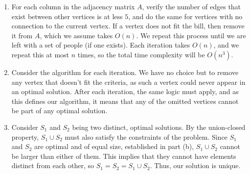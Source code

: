\documentclass{article}
\begin{document}
\begin{solution}
\begin{enumerate}[label=(\alph*)]
	\item For each column in the adjacency matrix $A$, verify the number of edges that exist between other vertices is at less $5$, and do the same for vertices with no connection to the current vertex. If a vertex does not fit the bill, then remove it from $A$, which we assume takes $O(n)$.  We repeat this process until we are left with a set of people (if one exists). Each iteration takes $O(n)$, and we repeat this at most $n$ times, so the total time complexity will be $O(n^3)$.

	\item Consider the algorithm for each iteration. We have no choice but to remove any vertex that doesn't fit the criteria, as such a vertex could never appear in an optimal solution. After each iteration, the same logic must apply, and as this defines our algorithm, it means that any of the omitted vertices cannot be part of any optimal solution.

	\item Consider $S_1$ and $S_2$ being two distinct, optimal solutions. By the union-closed property, $S_1 \cup S_2$ must also satisfy the constraints of the problem. Since $S_1$ and $S_2$ are optimal and of equal size, established in part (b), $S_1 \cup S_2$ cannot be larger than either of them. This implies that they cannot have elements distinct from each other, so $S_1 = S_2 = S_1 \cup S_2$. Thus, our solution is unique.
\end{enumerate}
\end{solution}
\end{document}
